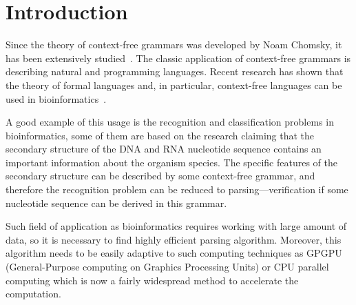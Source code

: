\section{Introduction}

Since the theory of context-free grammars was developed by Noam Chomsky, it has been extensively studied~\cite{chomsky1959certain,chomsky1963algebraic}. The classic application of context-free grammars is describing natural and programming  languages. Recent  research has  shown  that the theory of formal languages and, in particular, context-free languages can be used in bioinformatics~\cite{rivas,knudsen,yuan,dowell}.

A good example of this usage is the recognition and classification problems in bioinformatics, some of them are based on the research claiming that the secondary structure of the DNA and RNA nucleotide sequence contains an important information about the organism species. The specific features of the secondary structure can be described by some context-free grammar, and therefore the recognition problem can be reduced to parsing---verification if some nucleotide sequence can be derived in this grammar.

Such field of application as bioinformatics requires working with large amount of data, so it is necessary to find highly efficient parsing algorithm. Moreover, this algorithm needs to be easily adaptive to such computing techniques as GPGPU (General-Purpose computing on Graphics Processing Units) or CPU parallel computing which is now a fairly widespread method to accelerate the computation.

